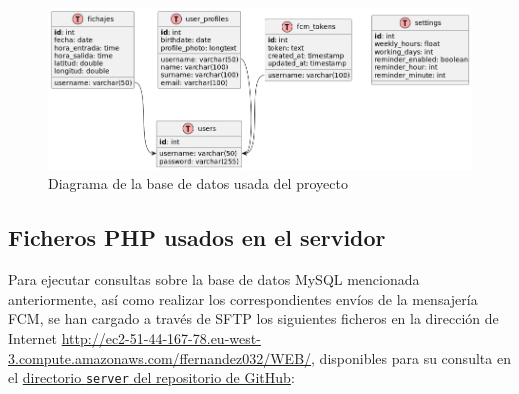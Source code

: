 \begin{figure}[H]
    \centering
    \includegraphics[width=1\linewidth]{root/bd.png}
    \caption{Diagrama de la base de datos usada del proyecto}
    \label{fig:bd}
\end{figure}

\subsection{Ficheros PHP usados en el servidor}

Para ejecutar consultas sobre la base de datos MySQL mencionada anteriormente, así como realizar los correspondientes envíos de la mensajería FCM, se han cargado a través de SFTP los siguientes ficheros en la dirección de Internet \url{http://ec2-51-44-167-78.eu-west-3.compute.amazonaws.com/ffernandez032/WEB/}, disponibles para su consulta en el \href{https://github.com/ffernandezco/TicTacker/tree/main/server}{directorio \texttt{server} del repositorio de GitHub}:

